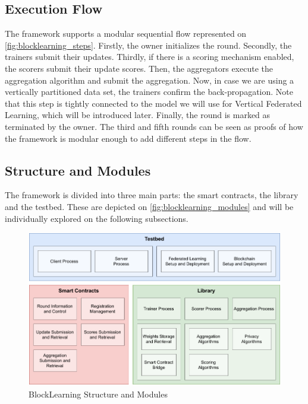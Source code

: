 \subsection{Execution Flow}\label{meth:exec_flow}

The framework supports a modular sequential flow represented on \autoref{fig:blocklearning_steps}. Firstly, the owner initializes the round. Secondly, the trainers submit their updates. Thirdly, if there is a scoring mechanism enabled, the scorers submit their update scores. Then, the aggregators execute the aggregation algorithm and submit the aggregation. Now, in case we are using a vertically partitioned data set, the trainers confirm the back-propagation. Note that this step is tightly connected to the model we will use for Vertical Federated Learning, which will be introduced later. Finally, the round is marked as terminated by the owner. The third and fifth rounds can be seen as proofs of how the framework is modular enough to add different steps in the flow.

\subsection{Structure and Modules}\label{meth:struct_modules}

The framework is divided into three main parts: the smart contracts, the library and the testbed. These are depicted on \autoref{fig:blocklearning_modules} and will be individually explored on the following subsections.

\begin{figure}[!ht]
    \centering
    \includegraphics[width=1\textwidth]{graphics/modules.pdf}
    \caption{BlockLearning Structure and Modules}
    \label{fig:blocklearning_modules}
\end{figure}

